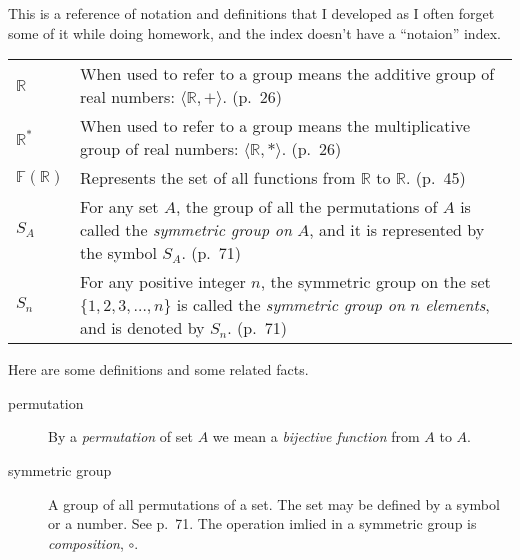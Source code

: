 \documentclass{amsart}
\newcommand{\Reals}{\ensuremath{\mathbb{R}}\xspace}
\begin{document}
This is a reference of notation and definitions that I developed as I
often forget some of it while doing homework, and the index doesn't
have a ``notaion'' index.

\begin{tabular}{lp{4in}}
  $\Reals$ & When used to refer to a group means the additive group of
  real numbers: $\langle \Reals, + \rangle$. (p.~26) \\

  $\Reals^*$ & When used to refer to a group means the multiplicative
  group of real numbers: $\langle \Reals, * \rangle$. (p.~26) \\

  $\mathbb{F}(\Reals)$ & Represents the set of all functions from
  \Reals to \Reals. (p.~45) \\

  $S_A$ & For any set $A$, the group of all the permutations of $A$
  is called the \emph{symmetric group on} $A$, and it is represented
  by the symbol $S_A$. (p.~71) \\

  $S_n$ & For any positive integer $n$, the symmetric group on the
  set $\{1, 2, 3, \ldots, n \}$ is called the \emph{symmetric group
    on} $n$ \emph{elements}, and is denoted by $S_n$. (p.~71) \\

\end{tabular}

Here are some definitions and some related facts.

\begin{description}
  \item[permutation] By a \emph{permutation} of set $A$ we mean a
    \emph{bijective function} from $A$ to $A$.

  \item[symmetric group] A group of all permutations of a set. The set
    may be defined by a symbol or a number. See p.~71. The operation
    imlied in a symmetric group is \emph{composition}, $\circ$.
\end{description}
\end{document}
